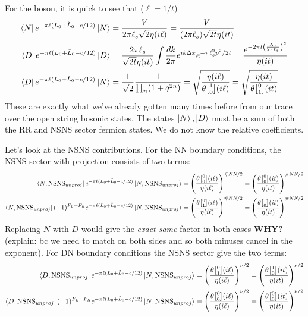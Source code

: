\documentclass[11pt, class=article, crop=false]{standalone}
\begin{document}
\begin{enumerate}
	For the boson, it is quick to see that ($\ell = 1/t$)
	\[
	\begin{aligned}
		\bra{N} e^{-\pi \ell (L_0 + \tilde L_0 - c/12)} \ket{N} &= \frac{V}{2\pi \ell_s \sqrt 2 \eta(i \ell)} = \frac{V}{(2\pi \ell_s) \sqrt{2 t} \eta(i t)} \\
		\bra{D} e^{-\pi \ell (L_0 + \tilde L_0 - c/12)} \ket{D} &= \frac{2 \pi \ell_s}{\sqrt{2 t} \eta(i t)} \int \frac{dk}{2\pi} e^{i k \Delta x} e^{-\pi \ell_s^2 p^2/2t} = \frac{e^{-2 \pi t \left( \frac{\Delta x}{2 \pi \ell_s} \right)^2 }}{\eta(i t)}\\
		\bra{D} e^{-\pi \ell (L_0 + \tilde L_0 - c/12)} \ket{N} &= \frac{1}{\sqrt 2} \frac{1}{\prod_n (1+q^{2n})} = \sqrt{\frac{\eta(i \ell )}{\theta\twist10 (i \ell)}} = \sqrt{\frac{\eta(i t)}{\theta\twist01 (i t)}}
	\end{aligned}
	\]
	These are exactly what we've already gotten many times before from our trace over the open string bosonic states. The states $\ket{N}, \ket{D}$ must be a sum of both the RR and NSNS sector fermion states. We do not know the relative coefficients. 
	
	Let's look at the NSNS contributions. For the NN boundary conditions, the NSNS sector with projection consists of two terms: 
	\[
		\begin{aligned}
			\bra{N, \text{NSNS}_{unproj}} e^{-\pi \ell (L_0 + \tilde L_0 - c/12)} \ket{N, \text{NSNS}_{unproj}}  &= \left(\frac{\theta\twist00(i \ell)}{\eta(i \ell)}\right)^{\# NN/2}  = \left(\frac{\theta\twist00(i t)}{\eta(i t)}\right)^{\# NN/2}\\
			\bra{N, \text{NSNS}_{unproj}} (-1)^{F_L = F_R} e^{-\pi \ell (L_0 + \tilde L_0 - c/12)} \ket{N, \text{NSNS}_{unproj}}  &= \left(\frac{\theta\twist01(i \ell)}{\eta(i \ell)}\right)^{\# NN / 2} = \left(\frac{\theta\twist10(i t)}{\eta(i t)}\right)^{\# NN / 2}
		\end{aligned}
	\]
	Replacing $N$ with $D$ would give the \emph{exact same} factor in both cases \textbf{WHY?} (explain: bc we need to match on both sides and so both minuses cancel in the exponent).  For DN boundary conditions the NSNS sector give the two terms:
	\[
		\begin{aligned}
			\bra{D, \text{NSNS}_{unproj}} e^{-\pi \ell (L_0 + \tilde L_0 - c/12)} \ket{N, \text{NSNS}_{unproj}}  &= \left(\frac{\theta\twist01(i \ell)}{\eta(i \ell)}\right)^{\nu/2} = \left(\frac{\theta\twist10(it)}{\eta(i t)}\right)^{\nu/2}\\
			\bra{D, \text{NSNS}_{unproj}} (-1)^{F_L = F_R} e^{-\pi \ell (L_0 + \tilde L_0 - c/12)} \ket{N, \text{NSNS}_{unproj}}  &= \left(\frac{\theta\twist00(i \ell)}{\eta(i \ell)}\right)^{\nu/2}  = \left(\frac{\theta\twist00(i t)}{\eta(i t)}\right)^{\nu/2}
		\end{aligned}
	\]
	

\end{enumerate}
\end{document}
